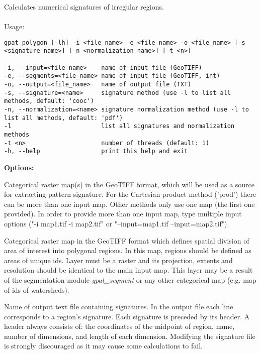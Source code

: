Calculates numerical signatures of irregular regions.
\\\\
Usage:

\begin{minipage}{\linewidth}
\begin{lstlisting}
gpat_polygon [-lh] -i <file_name> -e <file_name> -o <file_name> [-s <signature_name>] [-n <normalization_name>] [-t <n>]

-i, --input=<file_name>    name of input file (GeoTIFF)
-e, --segments=<file_name> name of input file (GeoTIFF, int)
-o, --output=<file_name>   name of output file (TXT)
-s, --signature=<name>     signature method (use -l to list all methods, default: 'cooc')
-n, --normalization=<name> signature normalization method (use -l to list all methods, default: 'pdf')
-l                         list all signatures and normalization methods
-t <n>                     number of threads (default: 1)
-h, --help                 print this help and exit
\end{lstlisting}
\end{minipage}

{\bf Options:}


Categorical raster map(s) in the GeoTIFF format, which will be used as a source for extracting pattern signature. 
For the Cartesian product method ('prod') there can be more than one input map. 
Other methods only use one map (the first one provided). 
In order to provide more than one input map, type multiple input options ("-i map1.tif -i map2.tif" or "--input=map1.tif --input=map2.tif").


Categorical raster map in the GeoTIFF format which defines spatial division of area of interest into polygonal regions.
In this map, regions should be defined as areas of unique ids. 
Layer must be a raster and its projection, extents and resolution should be identical to the main input map. 
This layer may be a result of the segmentation module {\it gpat\_segment} or any other categorical map (e.g. map of ids of watersheds).


Name of output text file containing signatures. 
In the output file each line corresponds to a region's signature.
Each signature is preceded by its header. 
A header always consists of: the coordinates of the midpoint of region, name, number of dimensions, and length of each dimension. 
Modifying the signature file is strongly discouraged as it may cause some calculations to fail.

